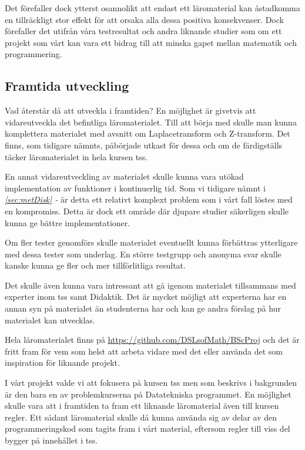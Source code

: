 \documentclass[12pt,a4paper,twoside,openright]{article}
\begin{document}
Det förefaller dock ytterst osannolikt att endast ett läromaterial kan
åstadkomma en tillräckligt stor effekt för att orsaka alla dessa
positiva konsekvenser. Dock förefaller det utifrån våra testresultat
och andra liknande studier som om ett projekt som vårt kan vara ett
bidrag till att minska gapet mellan matematik och programmering.

\subsection{Framtida utveckling}
Vad återstår då att utveckla i framtiden? En möjlighet är givetvis att
vidareutveckla det befintliga läromaterialet. Till att börja med
skulle man kunna komplettera materialet med avsnitt om
Laplacetransform och Z-transform. Det finns, som tidigare nämnts,
påbörjade utkast för dessa och om de färdigställs täcker
läromaterialet in hela kursen \gls{tss}.

En annat vidareutveckling av materialet skulle kunna vara utökad
implementation av funktioner i kontinuerlig tid. Som vi tidigare nämnt
i \textit{\ref{sec:metDisk} - } är detta ett
relativt komplext problem som i vårt fall löstes med en
kompromiss. Detta är dock ett område där djupare studier säkerligen
skulle kunna ge bättre implementationer.

Om fler tester genomförs skulle materialet eventuellt kunna förbättras
ytterligare med dessa tester som underlag. En större testgrupp och
anonyma svar skulle kanske kunna ge fler och mer tillförlitliga
resultat.

Det skulle även kunna vara intressant att gå igenom materialet
tillsammans med experter inom \gls{tss} samt Didaktik. Det är
mycket möjligt att experterna har en annan syn på materialet än
studenterna har och kan ge andra förslag på hur materialet kan
utvecklas.

Hela läromaterialet finns på
\url{https://github.com/DSLsofMath/BScProj} och det är fritt fram för
vem som helst att arbeta vidare med det eller använda det som
inspiration för liknande projekt.

I vårt projekt valde vi att fokusera på kursen \gls{tss} men som
beskrivs i bakgrunden är den bara en av problemkurserna på
Datatekniska programmet. En möjlighet skulle vara att i framtiden ta
fram ett liknande läromaterial även till kursen
\gls{regler}. Ett sådant läromaterial skulle då kunna använda
sig av delar av den programmeringskod som tagits fram i vårt material,
eftersom \gls{regler} till viss del bygger på innehållet i
\gls{tss}.
\end{document}

